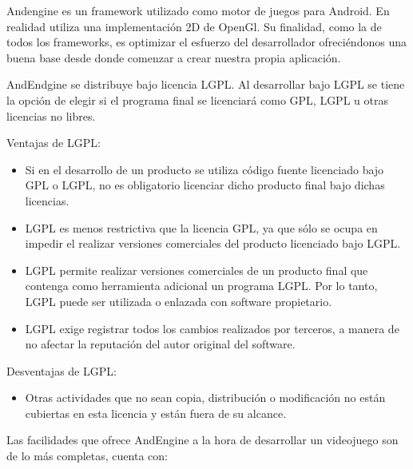 \documentclass[12 pt, a4paper, twoside]{article}
\begin{document}
Andengine es un framework utilizado como motor de juegos para Android. En
realidad utiliza una implementación 2D de OpenGl. Su
finalidad, como la de todos los frameworks, es optimizar el
esfuerzo del desarrollador ofreciéndonos una buena base desde donde
comenzar a crear nuestra propia aplicación.

AndEndgine se distribuye bajo licencia LGPL. Al desarrollar bajo LGPL se tiene la opción de elegir si el
programa final se licenciará como GPL, LGPL u otras licencias no
libres.

Ventajas de LGPL:
\begin{itemize}
\item Si en el desarrollo de un producto se utiliza código fuente
  licenciado bajo GPL o LGPL, no es obligatorio licenciar dicho
  producto final bajo dichas licencias.
\item LGPL es menos restrictiva que la licencia GPL, ya que sólo se
  ocupa en impedir el realizar versiones comerciales del producto
  licenciado bajo LGPL.
\item LGPL permite realizar versiones comerciales de un
  producto final que contenga como herramienta adicional un programa
  LGPL. Por lo tanto, LGPL puede ser utilizada o enlazada con software
  propietario.
\item LGPL exige registrar todos los cambios realizados por terceros,
  a manera de no afectar la reputación del autor original del
  software.
\end{itemize}

Desventajas de LGPL:
\begin{itemize}
\item Otras actividades que no sean copia, distribución o modificación
  no están cubiertas en esta licencia y están fuera de su alcance.
\end{itemize}

\clearpage
Las facilidades que ofrece AndEngine a la hora de desarrollar un
videojuego son de lo más completas, cuenta con:
\end{document}

